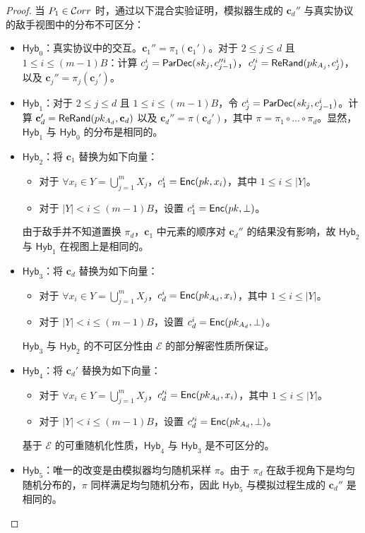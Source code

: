 \begin{proof}
当 $P_1 \in \mathcal{C}orr$ 时，通过以下混合实验证明，模拟器生成的 $\textbf{c}_{d}''$ 与真实协议的敌手视图中的分布不可区分：
\begin{itemize}
    \item $\mathsf{Hyb}_{0}$：真实协议中的交互。$\textbf{c}_{1}'' = {\pi_{1}}(\textbf{c}_{1}')$。对于 $2 \le j \le d$ 且 $1 \le i \le (m - 1)B$：计算 ${c}_{j}^i = \mathsf{ParDec}(sk_{j}, {c}_{j-1}''^i)$，${c}_{j}'^i = \mathsf{ReRand}(pk_{A_{j}}, {c}_{j}^i)$，以及 $\textbf{c}_{j}'' = {\pi_{j}}(\textbf{c}_{j}')$。
    \item $\mathsf{Hyb}_{1}$：对于 $2 \le j \le d$ 且 $1 \le i \le (m - 1)B$，令 ${c}_{j}^i = \mathsf{ParDec}(sk_{j}, {c}_{j-1}^i)$。计算 $\textbf{c}_{d}' = \mathsf{ReRand}(pk_{A_{d}},\textbf{c}_{d})$ 以及 $\textbf{c}_{d}'' = {\pi}(\textbf{c}_{d}')$，其中 $\pi = \pi_1 \circ \dots \circ \pi_{d}$。显然，$\mathsf{Hyb}_{1}$ 与 $\mathsf{Hyb}_{0}$ 的分布是相同的。
    \item $\mathsf{Hyb}_{2}$：将 $\textbf{c}_{1}$ 替换为如下向量：
    \begin{itemize}
        \item 对于 $\forall x_i \in Y = \bigcup_{j=1}^m X_j$，$c_1^i = \mathsf{Enc}(pk, x_i)$，其中 $1 \leq i \leq \lvert Y \rvert$。
        \item 对于 $\lvert Y \rvert < i \le (m-1)B$，设置 $c_1^i = \mathsf{Enc}(pk, \perp)$。
    \end{itemize}
    由于敌手并不知道置换 $\pi_{d}$，$\textbf{c}_{1}$ 中元素的顺序对 $\textbf{c}_{d}''$ 的结果没有影响，故 $\mathsf{Hyb}_{2}$ 与 $\mathsf{Hyb}_{1}$ 在视图上是相同的。
    \item $\mathsf{Hyb}_{3}$：将 $\textbf{c}_{d}$ 替换为如下向量：
    \begin{itemize}
        \item 对于 $\forall x_i \in Y = \bigcup_{j=1}^m X_j$，$c_d^i = \mathsf{Enc}(pk_{A_{d}}, x_i)$，其中 $1 \leq i \leq \lvert Y \rvert$。
        \item 对于 $\lvert Y \rvert < i \le (m-1)B$，设置 $c_d^i = \mathsf{Enc}(pk_{A_{d}}, \perp)$。
    \end{itemize}
    $\mathsf{Hyb}_{3}$ 与 $\mathsf{Hyb}_{2}$ 的不可区分性由 $\mathcal{E}$ 的部分解密性质所保证。
    \item $\mathsf{Hyb}_{4}$：将 $\textbf{c}_{d}'$ 替换为如下向量：
    \begin{itemize}
        \item 对于 $\forall x_i \in Y = \bigcup_{j=1}^m X_j$，${c}_{d}'^i = \mathsf{Enc}(pk_{A_{d}}, x_i)$，其中 $1 \leq i \leq \lvert Y \rvert$。
        \item 对于 $\lvert Y \rvert < i \le (m-1)B$，设置 ${c}_{d}'^i = \mathsf{Enc}(pk_{A_{d}}, \perp)$。
    \end{itemize}
    基于 $\mathcal{E}$ 的可重随机化性质，$\mathsf{Hyb}_{4}$ 与 $\mathsf{Hyb}_{3}$ 是不可区分的。
    \item $\mathsf{Hyb}_{5}$：唯一的改变是由模拟器均匀随机采样 $\pi$。由于 $\pi_{d}$ 在敌手视角下是均匀随机分布的，$\pi$ 同样满足均匀随机分布，因此 $\mathsf{Hyb}_{5}$ 与模拟过程生成的 $\textbf{c}_{d}''$ 是相同的。
\end{itemize}


\end{proof}

